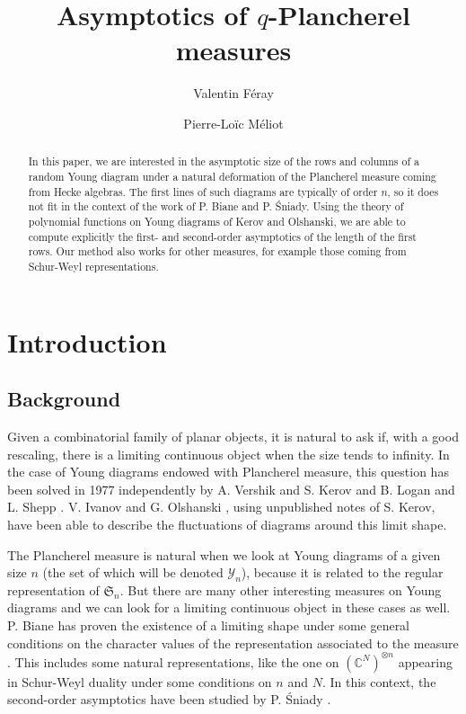 \documentclass[10pt]{amsart}
\author{Valentin F\'eray}
\author{Pierre-Lo\"ic M\'eliot}
\title{Asymptotics of $q$-Plancherel measures}
\theoremstyle{remark}
\newcommand{\C}{\mathbb{C}}
\newcommand{\sym}{\mathfrak{S}}
\newcommand{\young}{\mathscr{Y}}
\begin{document}
\begin{abstract}
 In this paper, we are interested in the asymptotic size of the rows and columns of a random Young diagram under a natural deformation of the Plancherel measure coming from Hecke algebras. The first lines of such diagrams are typically of order $n$, so it does not fit in the context of the work of P. Biane and P. \'Sniady. Using the theory of polynomial functions on Young diagrams of Kerov and Olshanski, we are able to compute explicitly the first- and second-order asymptotics of the length of the first rows. Our method also works for other measures, for example those coming from Schur-Weyl representations.
\end{abstract}

\maketitle

\section{Introduction}
\subsection{Background}\label{subsect:background}
Given a combinatorial family of planar objects, it is natural to ask if, with a good rescaling, there is a limiting continuous object when the size tends to infinity. In the case of Young diagrams endowed with Plancherel measure, this question has been solved in 1977 independently by A. Vershik and S. Kerov \cite{KV77} and B. Logan and L. Shepp \cite{LS77}. V. Ivanov and G. Olshanski \cite{IO02}, using unpublished notes of S. Kerov, have been able to describe the fluctuations of diagrams around this limit shape.\bigskip

The Plancherel measure is natural when we look at Young diagrams of a given size $n$ (the set of which will be denoted $\young_{n}$), because it is related to the regular representation of $\sym_n$. But there are many other interesting measures on Young diagrams and we can look for a limiting continuous object in these cases as well. P. Biane has proven the existence of a limiting shape under some general conditions on the character values of the representation associated to the measure \cite{Bia01}. This includes some natural representations, like the one on $(\C^N)^{\otimes n}$ appearing in Schur-Weyl duality under some conditions on $n$ and $N$. In this context, the second-order asymptotics have been studied by P. \'Sniady \cite{Sniady06}.\bigskip
\end{document}
